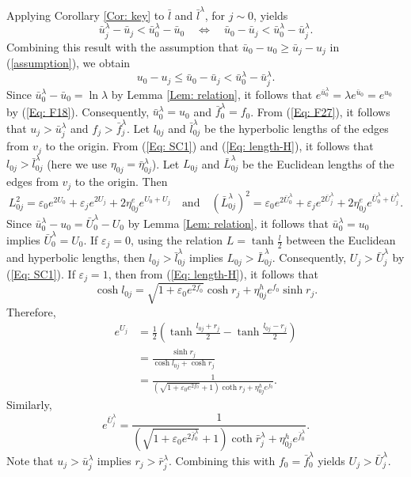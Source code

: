\documentclass[12pt]{amsart}
\theoremstyle{definition}
\begin{document}
Applying Corollary \ref{Cor: key} to $\bar{l}$ and $\bar{l}^\lambda$, for $j\sim 0$, yields
\begin{equation*}
\bar u^\lambda_j-\bar u_j<\bar u_0^\lambda-\bar u_0 \quad \Leftrightarrow \quad
\bar u_0-\bar u_j<\bar u_0^\lambda-\bar u_j^\lambda.
\end{equation*}
Combining this result with the assumption that $\bar u_0-u_0\geq\bar u_j-u_j$ in (\ref{assumption}), we obtain
\begin{equation}\label{Eq: F27}
u_0-u_j\leq \bar u_0-\bar u_j<\bar u_0^\lambda-\bar u_j^\lambda.
\end{equation}
Since $\bar u_0^\lambda-\bar u_0=\ln \lambda$ by Lemma \ref{Lem: relation},
it follows that $e^{\bar u_0^\lambda}=\lambda e^{\bar u_0}=e^{u_0}$ by (\ref{Eq: F18}).
Consequently, $\bar u_0^\lambda=u_0$ and $\bar{f}_0^\lambda=f_0$.
From (\ref{Eq: F27}), it follows that $u_j>\bar u_j^\lambda$ and $f_j>\bar f_j^\lambda$.
Let $l_{0j}$ and $\bar l^\lambda_{0j}$ be the hyperbolic lengths of the edges from $v_j$ to the origin.
From (\ref{Eq: SC1}) and (\ref{Eq: length-H}), it follows that $l_{0j}>\bar l^\lambda_{0j}$ (here we use $\eta_{0j}=\bar{\eta}^{\lambda}_{0j}$). Let $L_{0j}$ and $\bar L^\lambda_{0j}$ be the Euclidean lengths of the edges from $v_j$ to the origin. Then
\begin{equation*}
L^2_{0j}
=\varepsilon_0e^{2U_0}+\varepsilon_je^{2U_j}
+2\eta^e_{0j}e^{U_0+U_j}
\quad \text{and} \quad
(\bar L^\lambda_{0j})^2
=\varepsilon_0e^{2\bar{U}_0^\lambda}+ \varepsilon_je^{2\bar{U}_j^\lambda}+
2\eta^e_{0j}e^{\bar{U}_0^\lambda+\bar{U}_j^\lambda}.
\end{equation*}
Since $\bar u_0^\lambda-u_0=\bar U_0^\lambda-U_0$ by Lemma \ref{Lem: relation},
it follows that $\bar u_0^\lambda=u_0$ implies $\bar U_0^\lambda=U_0$.
If $\varepsilon_j=0$, using the relation $L=\tanh \frac{l}{2}$ between the Euclidean and hyperbolic lengths,
then $l_{0j}>\bar l^\lambda_{0j}$ implies $L_{0j}>\bar L^\lambda_{0j}$.
Consequently, $U_j>\bar{U}_j^\lambda$ by (\ref{Eq: SC1}).
If $\varepsilon_j=1$, then from (\ref{Eq: length-H}), it follows that
\begin{equation*}
\cosh l_{0j}=\sqrt{1+\varepsilon_0e^{2f_0}}
\cosh r_j+\eta^h_{0j}e^{f_0}\sinh r_j.
\end{equation*}
Therefore,
\begin{align*}
e^{U_j}
&=\frac{1}{2}(\tanh \frac{l_{0j}+r_j}{2}-\tanh \frac{l_{0j}-r_j}{2})\\
&=\frac{\sinh r_j}{\cosh l_{0j}+\cosh r_j}\\
&=\frac{1}{(\sqrt{1+\varepsilon_0e^{2f_0}}+1)
\coth r_j+\eta^h_{0j}e^{f_0}}.
\end{align*}
Similarly,
\begin{equation*}
e^{\bar U_j^\lambda}
=\frac{1}{(\sqrt{1+\varepsilon_0e^{2\bar{f}^\lambda_0}}+1)
\coth \bar{r}^\lambda_j+\eta^h_{0j}e^{\bar{f}^\lambda_0}}.
\end{equation*}
Note that $u_j>\bar{u}^\lambda_j$ implies $r_j>\bar{r}^\lambda_j$.
Combining this with $f_0=\bar{f}_0^\lambda$ yields $U_j>\bar U_j^\lambda$.
\end{document}

